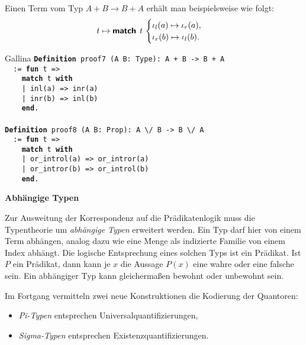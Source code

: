 \documentclass[8pt]{beamer}
\newcommand{\strong}[1]{\textsf{\textbf{#1}}}
\newcommand{\centerheadline}[1]{%
  \begin{center}\strong{#1}\end{center}}
\newcommand{\parspace}{\vspace{0.8em}}
\newcommand{\kw}[1]{\textbf{#1}}
\begin{document}
\begin{frame}
Einen Term vom Typ $A+B\to B+A$ erhält man beispielsweise wie folgt:\pause
\[t\mapsto\strong{match}\;\,t\,\begin{cases}
\iota_l(a)\mapsto\iota_r(a),\\
\iota_r(b)\mapsto\iota_l(b).
\end{cases}\]\pause
\begin{block}{Gallina}
\texttt{\kw{Definition} proof7 (A B: Type): A + B -> B + A\\
\ \ := \kw{fun} t =>\\
\ \ \ \ \kw{match} t \kw{with}\\
\ \ \ \ | inl(a) => inr(a)\\
\ \ \ \ | inr(b) => inl(b)\\
\ \ \ \ \kw{end}.}\\
\mbox{}\\
\texttt{\kw{Definition} proof8 (A B: Prop): A {\textbackslash}/ B -> B {\textbackslash}/ A\\
\ \ := \kw{fun} t =>\\
\ \ \ \ \kw{match} t \kw{with}\\
\ \ \ \ | or\_introl(a) => or\_intror(a)\\
\ \ \ \ | or\_intror(b) => or\_introl(b)\\
\ \ \ \ \kw{end}.}
\end{block}
\end{frame}

\begin{frame}
\centerheadline{Abhängige Typen}
\end{frame}

\begin{frame}
Zur Ausweitung der Korrespondenz auf die Prädikatenlogik
muss die Typentheorie um \emph{abhängige Typen} erweitert werden.
Ein Typ darf hier von einem Term abhängen, analog dazu wie eine
Menge als indizierte Familie von einem Index abhängt. Die logische
Entsprechung eines solchen Typs ist ein Prädikat. Ist $P$ ein
Prädikat, dann kann je $x$ die Aussage $P(x)$ eine wahre oder
eine falsche sein. Ein abhängiger Typ kann gleichermaßen bewohnt oder
unbewohnt sein.

\parspace
Im Fortgang vermitteln zwei neue Konstruktionen
die Kodierung der Quantoren:
\begin{itemize}
\item \emph{Pi-Typen} entsprechen Universalquantifizierungen,
\item \emph{Sigma-Typen} entsprechen Existenzquantifizierungen.
\end{itemize}
\end{frame}
\end{document}
